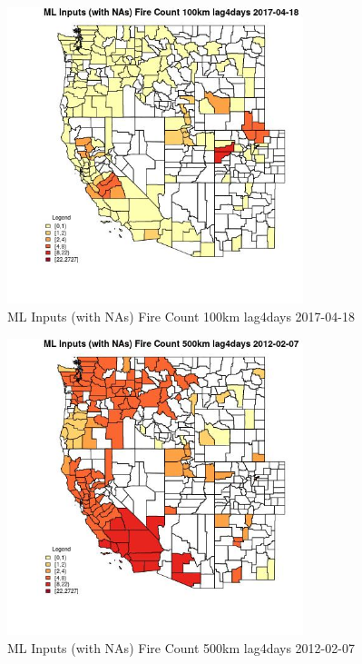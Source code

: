 \begin{figure} 
\centering  
\includegraphics[width=0.77\textwidth]{Code_Outputs/Report_ML_input_PM25_Step4_part_f_de_duplicated_aves_prioritize_24hr_obswNAs_CountyFire_Count_100km_lag4daysMean2017-04-18.jpg} 
\caption{\label{fig:Report_ML_input_PM25_Step4_part_f_de_duplicated_aves_prioritize_24hr_obswNAsCountyFire_Count_100km_lag4daysMean2017-04-18}ML Inputs (with NAs) Fire Count 100km lag4days 2017-04-18} 
\end{figure} 
 

\begin{figure} 
\centering  
\includegraphics[width=0.77\textwidth]{Code_Outputs/Report_ML_input_PM25_Step4_part_f_de_duplicated_aves_prioritize_24hr_obswNAs_CountyFire_Count_500km_lag4daysMean2012-02-07.jpg} 
\caption{\label{fig:Report_ML_input_PM25_Step4_part_f_de_duplicated_aves_prioritize_24hr_obswNAsCountyFire_Count_500km_lag4daysMean2012-02-07}ML Inputs (with NAs) Fire Count 500km lag4days 2012-02-07} 
\end{figure} 
 

